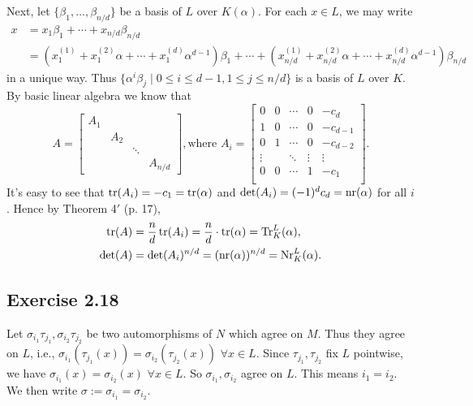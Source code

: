 \documentclass[../Marcus.tex]{subfiles}
\begin{document}
Next, let $\{\beta_1,\ldots,\beta_{n/d}\}$ be a basis of $L$ over $K(\alpha)$. For each $x\in L$, we may write
\begin{align*}
    x &= x_1\beta_1+\cdots+x_{n/d}\beta_{n/d} \\ &=(x^{(1)}_{1}+x^{(2)}_{1}\alpha+\cdots+x^{(d)}_{1}\alpha^{d-1})\beta_1+\cdots+(x^{(1)}_{n/d}+x^{(2)}_{n/d}\alpha+\cdots+x^{(d)}_{n/d}\alpha^{d-1})\beta_{n/d}
\end{align*}
in a unique way. Thus $\{\alpha^{i}\beta_j\mid 0\leq i\leq d-1,1\leq j \leq n/d\}$ is a basis of $L$ over $K$. By basic linear algebra we know that
$$
A=\begin{bmatrix}
    A_1 &         &             &               \\
           & A_2 &             &               \\
           &         & \ddots &               \\
           &         &             & A_{n/d}
\end{bmatrix}, \text{where }
A_i=
\begin{bmatrix}
    0          & 0  & \cdots & 0         & -c_d       \\
    1           & 0 & \cdots & 0          & -c_{d-1} \\
    0          & 1  & \cdots & 0          & -c_{d-2}     \\
    \vdots &     & \ddots & \vdots & \vdots       \\
    0         & 0  & \cdots & 1           & -c_1       \\
\end{bmatrix}.
$$
It's easy to see that $\operatorname{tr}(A_i)=-c_1=\operatorname{tr}(\alpha)$ and $\det(A_i)=(-1)^dc_d=\operatorname{nr}(\alpha)$ for all $i$. Hence by Theorem 4$'$ (p. 17),
\begin{align*}
    \operatorname{tr}(A)&=\frac{n}{d}\operatorname{tr}(A_i)=\frac{n}{d}\cdot\operatorname{tr}(\alpha)=\operatorname{Tr}^L_K(\alpha), \\
    \det(A)&=\det(A_i)^{n/d}=(\operatorname{nr}(\alpha))^{n/d}=\operatorname{Nr}^L_K(\alpha).
\end{align*}

\subsection*{Exercise 2.18}

Let $\sigma_{i_1}\tau_{j_1},\sigma_{i_2}\tau_{j_2}$ be two automorphisms of $N$ which agree on $M$. Thus they agree on $L$, i.e., $\sigma_{i_1}(\tau_{j_1}(x))=\sigma_{i_2}(\tau_{j_2}(x))$ $\forall x\in L$. Since $\tau_{j_1},\tau_{j_2}$ fix $L$ pointwise, we have $\sigma_{i_1}(x)=\sigma_{i_2}(x)$ $\forall x\in L$. So $\sigma_{i_1},\sigma_{i_2}$ agree on $L$. This means $i_1=i_2$. We then write $\sigma:=\sigma_{i_1}=\sigma_{i_2}$.
\end{document}
